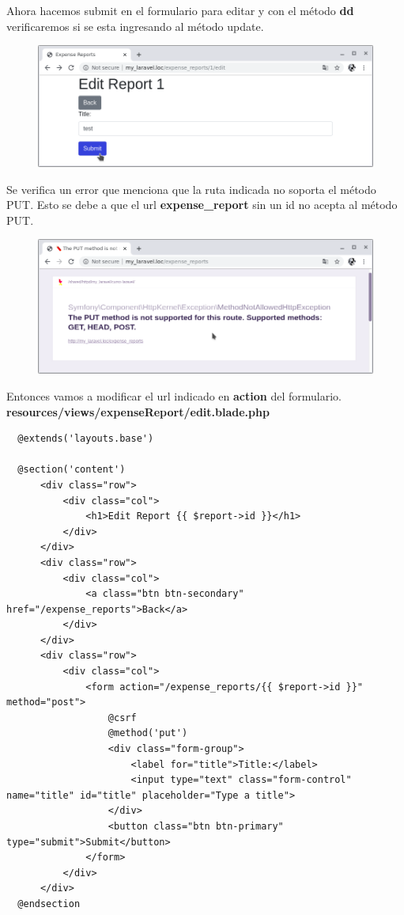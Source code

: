 \documentclass{article}
\begin{document}
Ahora hacemos submit en el formulario para editar y con el método \textbf{dd}
verificaremos si se esta ingresando al método update.\\

\begin{figure}[h!]
  \centering
  \includegraphics[scale=0.5]{./Pictures/072_submit_test.png}
\end{figure}

Se verifica un error que menciona que la ruta indicada no soporta el método
PUT. Esto se debe a que el url \textbf{expense\_report} sin un id no acepta al
método PUT.\\

\begin{figure}[h!]
  \centering
  \includegraphics[scale=0.5]{./Pictures/073_error_put.png}
\end{figure}

Entonces vamos a modificar el url indicado en \textbf{action} del formulario.\\

\textbf{resources/views/expenseReport/edit.blade.php}
\begin{verbatim}
  @extends('layouts.base')

  @section('content')
      <div class="row">
          <div class="col">
              <h1>Edit Report {{ $report->id }}</h1>
          </div>
      </div>
      <div class="row">
          <div class="col">
              <a class="btn btn-secondary" href="/expense_reports">Back</a>
          </div>
      </div>
      <div class="row">
          <div class="col">
              <form action="/expense_reports/{{ $report->id }}" method="post">
                  @csrf
                  @method('put')
                  <div class="form-group">
                      <label for="title">Title:</label>
                      <input type="text" class="form-control" name="title" id="title" placeholder="Type a title">
                  </div>
                  <button class="btn btn-primary" type="submit">Submit</button>
              </form>
          </div>
      </div>
  @endsection
\end{verbatim}
\end{document}
